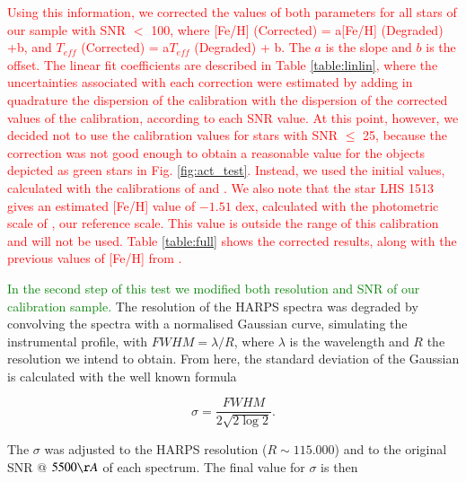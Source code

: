 \documentclass{aa}
\begin{document}
\textcolor{red}{Using this information, we corrected the values of both parameters for all stars of our sample with SNR $<$ 100, where [Fe/H] (Corrected) = a[Fe/H] (Degraded) +b, and $T_{eff}$ (Corrected) = a$T_{eff}$ (Degraded) + b. The $a$ is the slope and $b$ is the offset. The linear fit coefficients are described in Table \ref{table:linlin}, where the uncertainties associated with each correction were estimated by adding in quadrature the dispersion of the calibration with the dispersion of the corrected values of the calibration, according to each SNR value. At this point, however, we decided not to use the calibration values for stars with SNR $\leq$ 25, because the correction was not good enough to obtain a reasonable value for the objects depicted as green stars in Fig. \ref{fig:act_test}. Instead, we used the initial values, calculated with the calibrations of \citet{Neves-2012} and \citet{Casagrande-2008}. We also note that the star LHS 1513 gives an estimated [Fe/H] value of $-1.51$ dex, calculated with the photometric scale of \citet{Neves-2012}, our reference scale. This value is outside the range of this calibration and will not be used. Table \ref{table:full} shows the corrected results, along with the previous values of [Fe/H] from \citet{Neves-2013}.} %


\textcolor{green}{In the second step of this test we modified both resolution and SNR of our calibration sample.} The resolution of the HARPS spectra was degraded by convolving the spectra with a normalised Gaussian curve, simulating the instrumental profile, with $FWHM = \lambda/R$, where $\lambda$ is the wavelength and $R$ the resolution we intend to obtain. %
From here, the standard deviation of the Gaussian is calculated with the well known formula 

\begin{equation}
\label{eq:fwhm}
\sigma = \frac{FWHM}{2\sqrt{2\log{2}}}. 
\end{equation}

The $\sigma$ was adjusted to the HARPS resolution ($R\sim115.000$) and to the original SNR @ $5500 \AA$  of each spectrum. The final value for $\sigma$ is then


\end{document}
